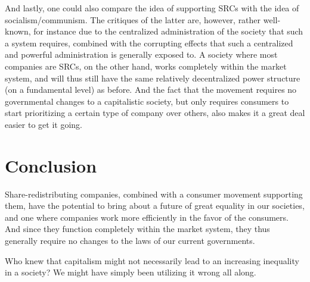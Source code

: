 \documentclass{article}
\begin{document}
And lastly, one could also compare the idea of supporting SRCs with the idea of socialism/communism. The critiques of the latter are, however, rather well-known, for instance due to the centralized administration of the society that such a system requires, combined with the corrupting effects that such a centralized and powerful administration is generally exposed to. 
A society where most companies are SRCs, on the other hand, works completely within the market system, and will thus still have the same relatively decentralized power structure (on a fundamental level) as before. And the fact that the movement requires no governmental changes to a capitalistic society, but only requires consumers to start prioritizing a certain type of company over others, also makes it a great deal easier to get it going. 




\section{Conclusion}

Share-redistributing companies, combined with a consumer movement supporting them, have the potential to bring about a future of great equality in our societies, and one where companies work more efficiently in the favor of the consumers. And since they function completely within the market system, they thus generally require no changes to the laws of our current governments. 

Who knew that capitalism might not necessarily lead to an increasing inequality in a society? We might have simply been utilizing it wrong all along.



















\end{document}
